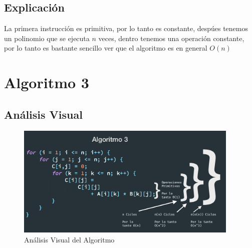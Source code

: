 \documentclass[12pt, fleqn]{article}                            %
\theoremstyle{break}                                            %
\begin{document}
    \subsection{Explicación}

        La primera instrucción es primitiva, por lo tanto es constante,
        despúes tenemos un polinomio que se ejecuta $n$ veces,
        dentro tenemos una operación constante, por lo tanto es bastante
        sencillo ver que el algoritmo es en general $O(n)$



\clearpage
\section{Algoritmo 3}


    \subsection{Análisis Visual}

        \begin{figure}[h]
            \centering
            \includegraphics[width=0.95\textwidth]{Algoritmo3}
            \caption{Análisis Visual del Algoritmo}
        \end{figure}

    \vspace{1em}
\end{document}
